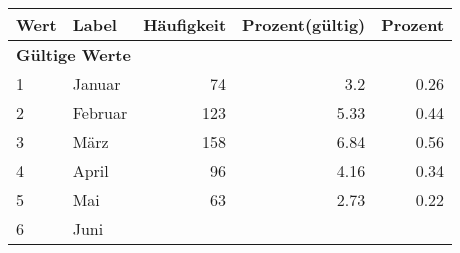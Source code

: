      \begin{longtable}{lXrrr}
     \toprule
     \textbf{Wert} & \textbf{Label} & \textbf{Häufigkeit} & \textbf{Prozent(gültig)} & \textbf{Prozent} \\
     \endhead
     \midrule
     \multicolumn{5}{l}{\textbf{Gültige Werte}}\\

     1 &
     \multicolumn{1}{X}{ Januar   } &


       \num{74} &
       \num[round-mode=places,round-precision=2]{3,2} &
         \num[round-mode=places,round-precision=2]{0,26} \\

     2 &
     \multicolumn{1}{X}{ Februar   } &


       \num{123} &
       \num[round-mode=places,round-precision=2]{5,33} &
         \num[round-mode=places,round-precision=2]{0,44} \\

     3 &
     \multicolumn{1}{X}{ März   } &


       \num{158} &
       \num[round-mode=places,round-precision=2]{6,84} &
         \num[round-mode=places,round-precision=2]{0,56} \\

     4 &
     \multicolumn{1}{X}{ April   } &


       \num{96} &
       \num[round-mode=places,round-precision=2]{4,16} &
         \num[round-mode=places,round-precision=2]{0,34} \\

     5 &
     \multicolumn{1}{X}{ Mai   } &


       \num{63} &
       \num[round-mode=places,round-precision=2]{2,73} &
         \num[round-mode=places,round-precision=2]{0,22} \\

     6 &
     \multicolumn{1}{X}{ Juni   } &



\end{longtable}

